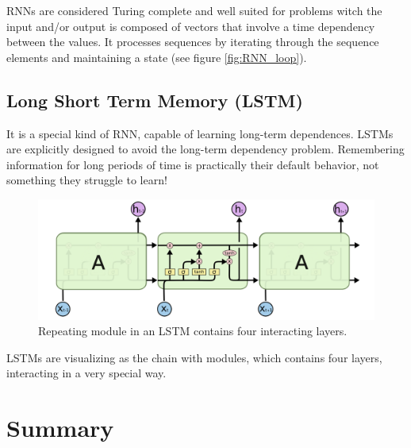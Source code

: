 \documentclass[thesis=M,english]{FITthesis}[2012/10/20]
\begin{document}
RNNs are considered Turing complete and well suited for problems witch the input and/or output is composed of vectors that involve a time dependency between the values. It processes sequences by iterating through the sequence elements and maintaining a state (see figure \ref{fig:RNN_loop}). 

 
\subsection{Long Short Term Memory (LSTM)}
It is a special kind of RNN, capable of learning long-term dependences. LSTMs are explicitly designed to avoid the long-term dependency problem. Remembering information for long periods of time is practically their default behavior, not something they struggle to learn!



\begin{figure}\centering
	\includegraphics[scale=0.5]{images/LSTM_1}
	\caption{Repeating module in an LSTM contains four interacting layers.}\label{fig:LSTM}
\end{figure}

LSTMs are visualizing as the chain with modules, which contains four layers,  interacting in a very special way.





\section{Summary}



\begin{conclusion}

\end{conclusion}




\appendix

\end{document}
